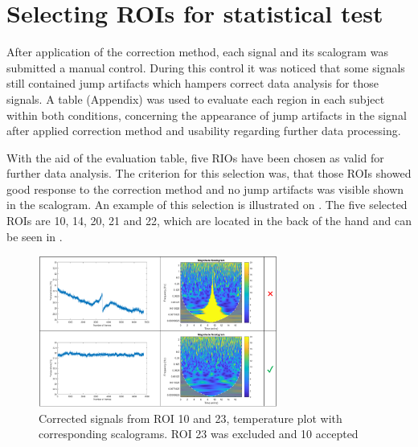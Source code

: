 \section{Selecting ROIs for statistical test}

After application of the correction method, each signal and its scalogram was submitted a manual control. During this control it was noticed that some signals still contained jump artifacts which hampers correct data analysis for those signals. A table (Appendix) was used to evaluate each region in each subject within both conditions, concerning the appearance of jump artifacts in the signal after applied correction method and usability regarding further data processing.

With the aid of the evaluation table, five RIOs have been chosen as valid for further data analysis. The criterion for this selection was, that those ROIs showed good response to the correction method and no jump artifacts was visible shown in the scalogram. An example of this selection is illustrated on . The five selected ROIs are 10, 14, 20, 21 and 22, which are located in the back of the hand and can be seen in .

\begin{figure}[H]
	\includegraphics[width=0.7\textwidth]{figures/ROI_selection}
	\caption{Corrected signals from ROI 10 and 23, temperature plot with corresponding scalograms. ROI 23 was excluded and 10 accepted}
	\label{fig:selection}
\end{figure} 